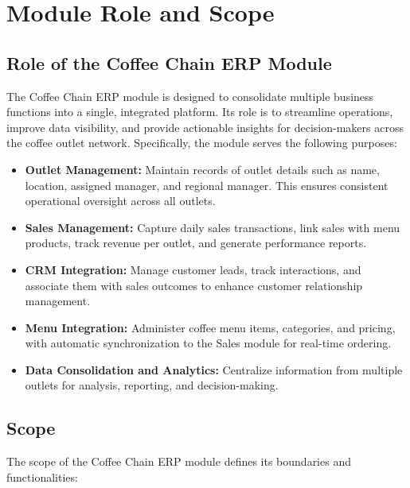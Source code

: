 \chapter{Module Role and Scope}

\section*{Role of the Coffee Chain ERP Module}

The Coffee Chain ERP module is designed to consolidate multiple business functions into a single, integrated platform. Its role is to streamline operations, improve data visibility, and provide actionable insights for decision-makers across the coffee outlet network. Specifically, the module serves the following purposes:

\begin{itemize}
    \item \textbf{Outlet Management:} Maintain records of outlet details such as name, location, assigned manager, and regional manager. This ensures consistent operational oversight across all outlets.
    \item \textbf{Sales Management:} Capture daily sales transactions, link sales with menu products, track revenue per outlet, and generate performance reports.
    \item \textbf{CRM Integration:} Manage customer leads, track interactions, and associate them with sales outcomes to enhance customer relationship management.
    \item \textbf{Menu Integration:} Administer coffee menu items, categories, and pricing, with automatic synchronization to the Sales module for real-time ordering.
    \item \textbf{Data Consolidation and Analytics:} Centralize information from multiple outlets for analysis, reporting, and decision-making.
\end{itemize}

\vspace{1em}

\section*{Scope}

The scope of the Coffee Chain ERP module defines its boundaries and functionalities:


